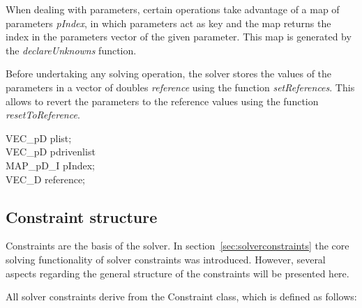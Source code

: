 \documentclass[12pt,twoside,a4paper]{book}
\begin{document}
    When dealing with parameters, certain operations take advantage of a map of parameters \emph{pIndex}, in which parameters act as key and the map returns the index in the parameters vector of the given parameter. This map is generated by the \emph{declareUnknowns} function.

    Before undertaking any solving operation, the solver stores the values of the parameters in a vector of doubles \emph{reference} using the function \emph{setReferences}. This allows to revert the parameters to the reference values using the function \emph{resetToReference}.

    \begin{codequote}
    VEC\_pD plist;\\
    VEC\_pD pdrivenlist\\
    MAP\_pD\_I pIndex;\\
    VEC\_D reference;
    \end{codequote}

    \subsection{Constraint structure}

    Constraints are the basis of the solver. In section~\ref{sec:solverconstraints} the core solving functionality of solver constraints was introduced. However, several aspects regarding the general structure of the constraints will be presented here.

    All solver constraints derive from the Constraint class, which is defined as follows:
\end{document}
